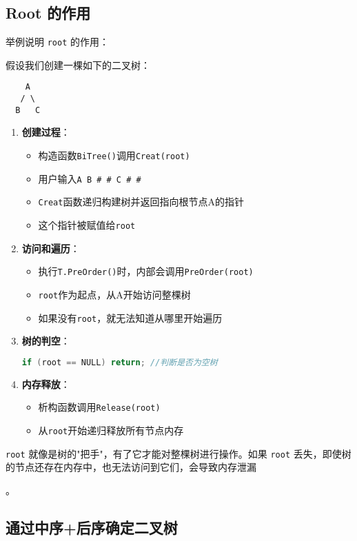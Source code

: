 \subsection{Root 的作用}

举例说明 \lstinline{root} 的作用：

假设我们创建一棵如下的二叉树：

\begin{lstlisting}
    A
   / \
  B   C
\end{lstlisting}
\begin{enumerate}
	\item \textbf{创建过程}：
	\begin{itemize}
		\item 构造函数\lstinline{BiTree()}调用\lstinline{Creat(root)}
		\item 用户输入\lstinline{A B # # C # #}
		\item \lstinline{Creat}函数递归构建树并返回指向根节点A的指针
		\item 这个指针被赋值给\lstinline{root}
	\end{itemize}
	\item \textbf{访问和遍历}：
	\begin{itemize}
		\item 执行\lstinline{T.PreOrder()}时，内部会调用\lstinline{PreOrder(root)}
		\item \lstinline{root}作为起点，从A开始访问整棵树
		\item 如果没有\lstinline{root}，就无法知道从哪里开始遍历
	\end{itemize}
	\item \textbf{树的判空}：
\begin{lstlisting}[language=C++]
if (root == NULL) return; //判断是否为空树
\end{lstlisting}	\item \textbf{内存释放}：
	\begin{itemize}
		\item 析构函数调用\lstinline{Release(root)}
		\item 从\lstinline{root}开始递归释放所有节点内存
	\end{itemize}
\end{enumerate}

\lstinline{root} 就像是树的"把手"，有了它才能对整棵树进行操作。如果 \lstinline{root} 丢失，即使树的节点还存在内存中，也无法访问到它们，会导致内存泄漏

。

\subsection{通过中序+后序确定二叉树}

